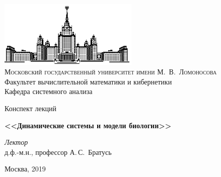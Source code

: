 \thispagestyle{empty}
\begin{center}
    \ \vspace{-3cm}

    \includegraphics[width=0.5\textwidth]{title_page/msu.eps}\\

    {\scshape Московский государственный университет имени М.~В.~Ломоносова}\\
    Факультет вычислительной математики и кибернетики\\
    Кафедра системного анализа

    \vfill

    {\LARGE Конспект лекций}

    \vspace{1cm}

    {\Huge\bfseries <<Динамические системы и модели биологии>>}
\end{center}

\vspace{3cm}

\begin{flushright}
    \large
    \textit{Лектор}\\
    д.ф.-м.н., профессор А.\,С.~Братусь
\end{flushright}

\vfill

\begin{center}
    Москва, 2019
\end{center}

\clearpage